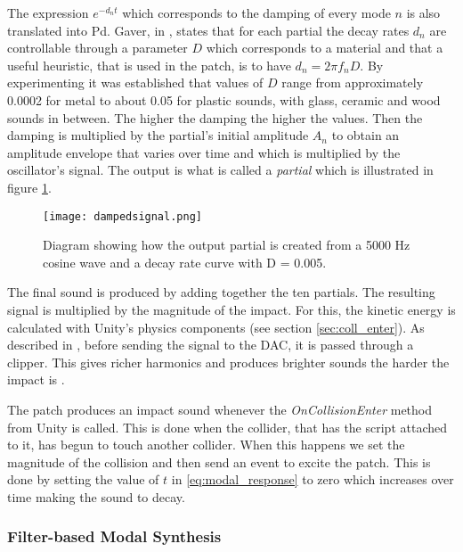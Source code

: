 The expression $e^{-d_n t}$ which corresponds to the damping of every mode $n$ is also translated into \gls{Pd}. Gaver, in \cite{gaver1993we}, states that for each partial the decay rates $d_n$ are controllable through a parameter $D$ which corresponds to a material and that a useful heuristic, that is used in the patch, is to have $d_n = 2 \pi f_nD$. By experimenting it was established that values of $D$ range from approximately 0.0002 for metal to about 0.05 for plastic sounds, with glass, ceramic and wood sounds in between. The higher the damping the higher the values. Then the damping is multiplied by the partial's initial amplitude $A_n$ to obtain an amplitude envelope that varies over time and which is multiplied by the oscillator's signal. The output is what is called a \textit{partial} which is illustrated in figure \ref{fig:dampedsignal}. 

\begin{figure}[H]
  \centering
    \texttt{[image: dampedsignal.png]}
      \caption{Diagram showing how the output partial is created from a 5000 Hz cosine wave and a decay rate curve with D = 0.005.}
      \label{fig:dampedsignal}
\end{figure}

The final sound is produced by adding together the ten partials. The resulting signal is multiplied by the magnitude of the impact. For this, the kinetic energy is calculated with Unity\textsuperscript{\textregistered}'s physics components (see section \ref{sec:coll_enter}). As described in \cite{farnell2010designing}, before sending the signal to the \gls{DAC}, it is passed through a clipper. This gives richer harmonics and produces brighter sounds the harder the impact is \cite{aramaki2009thinking}.

The patch produces an impact sound whenever the \textit{OnCollisionEnter} method from Unity\textsuperscript{\textregistered} is called. This is done when the collider, that has the script attached to it, has begun to touch another collider. When this happens we set the magnitude of the collision and then send an event to excite the patch. This is done by setting the value of $t$ in \ref{eq:modal_response} to zero which increases over time making the sound to decay.

\subsubsection{Filter-based Modal Synthesis}\label{sec:filter_synth}


